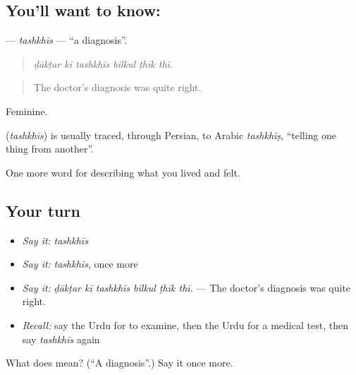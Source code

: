 \subsection*{You'll want to know: }
\textbf{} — \emph{tashkhīs} — \textquotedblleft{}a diagnosis\textquotedblright{}.

\begin{quote}
     
\end{quote}

\begin{quote}
\emph{ḍākṭar kī tashkhīs bilkul ṭhīk thī.}
\end{quote}

\begin{quote}
The doctor's diagnosis was quite right.
\end{quote}

Feminine.

\begin{cousinweb}
\textbf{} (\emph{tashkhīs}) is usually traced, through Persian, to Arabic \emph{tashkhīṣ}, \textquotedblleft{}telling one thing from another\textquotedblright{}.
\end{cousinweb}

\begin{grammarlens}[title={What you've built}]
One more word for describing what you lived and felt.
\end{grammarlens}

\subsection*{Your turn}
\begin{itemize}
\raggedright
  \item \emph{Say it:} \emph{tashkhīs}
  \item \emph{Say it:} \emph{tashkhīs}, once more
  \item \emph{Say it:} \emph{ḍākṭar kī tashkhīs bilkul ṭhīk thī.} — The doctor's diagnosis was quite right.
  \item \emph{Recall:} say the Urdu for to examine, then the Urdu for a medical test, then say \emph{tashkhīs} again
\end{itemize}

\begin{tcolorbox}[breakable,colback=teal!4,colframe=teal!35!black,title={Before you move on}]
What does  mean? (\textquotedblleft{}A diagnosis\textquotedblright{}.) Say it once more.
\end{tcolorbox}
